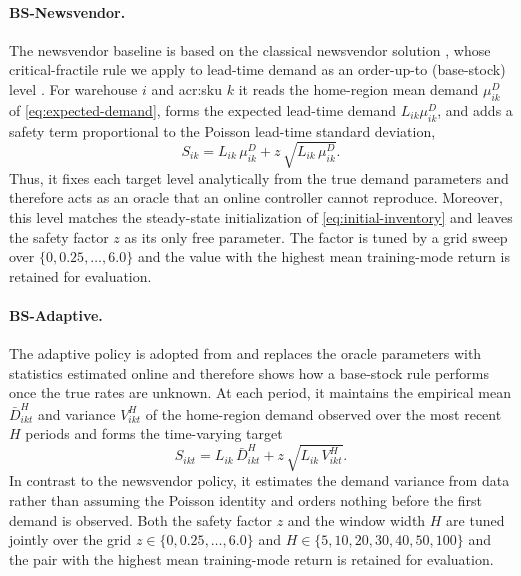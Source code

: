 \paragraph{\textbf{BS-Newsvendor.}} The newsvendor baseline is based on the classical
newsvendor solution \citep{arrow1951newsvendor}, whose critical-fractile rule we
apply to lead-time demand as an order-up-to (base-stock) level
\citep{axsäter2015inventory, zipkin2000foundations}. For warehouse $i$ and \gls{acr:sku} $k$ it reads
the home-region mean demand $\mu^D_{ik}$ of \autoref{eq:expected-demand}, forms the
expected lead-time demand $L_{ik}\mu^D_{ik}$, and adds a safety term proportional to
the Poisson lead-time standard deviation,
\begin{equation}
\label{eq:bs-newsvendor}
  S_{ik}=L_{ik}\,\mu^D_{ik}+z\,\sqrt{L_{ik}\,\mu^D_{ik}}.
\end{equation}
Thus, it fixes each target level analytically from the true demand parameters and therefore acts as an oracle that an online controller cannot reproduce. Moreover, this level matches the steady-state initialization of \autoref{eq:initial-inventory} and leaves the safety factor $z$ as its only free parameter. The factor is tuned by a
grid sweep over $\{0,0.25,\dots,6.0\}$ and the value with the highest mean
training-mode return is retained for evaluation.

\paragraph{\textbf{BS-Adaptive.}} The adaptive policy is adopted from \citet{Neale2009} and replaces the oracle parameters with
statistics estimated online and therefore shows how a base-stock rule performs once
the true rates are unknown. At each period, it maintains the empirical mean
$\bar D^{H}_{ikt}$ and variance $V^{H}_{ikt}$ of the home-region demand observed over
the most recent $H$ periods and forms the time-varying target
\begin{equation}
\label{eq:bs-adaptive}
  S_{ikt}=L_{ik}\,\bar D^{H}_{ikt}+z\,\sqrt{L_{ik}\,V^{H}_{ikt}}.
\end{equation}
In contrast to the newsvendor policy, it estimates the demand variance from data
rather than assuming the Poisson identity and orders nothing before the first demand is observed. Both the safety factor $z$ and the window width $H$ are tuned jointly
over the grid $z\in\{0,0.25,\dots,6.0\}$ and $H\in\{5,10,20,30,40,50,100\}$ and the
pair with the highest mean training-mode return is retained for evaluation.

